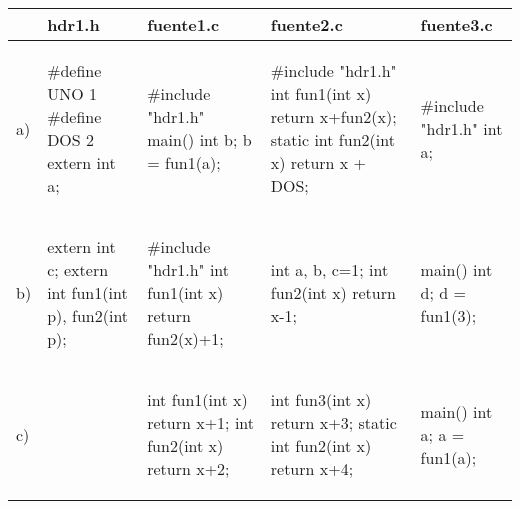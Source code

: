 \begin{table}
\centering
\begin{tabular}{p{0.2cm}|p{3cm}|p{3.5cm}|p{3.5cm}|p{3cm}}
& hdr1.h & fuente1.c & fuente2.c & fuente3.c\\
\hline


a)
&
\begin{codecell}
#define UNO 1   
#define DOS 2 
extern int a;
\end{codecell}
&
\begin{codecell}
#include "hdr1.h"
main() 
{ 
	int b;
	b = fun1(a);
}
\end{codecell}
&
\begin{codecell}
#include "hdr1.h"
int fun1(int x) 
{
	return x+fun2(x);
}
static int 
	fun2(int x) 
{
	return x + DOS;
}
\end{codecell}
&
\begin{codecell}
#include "hdr1.h"
int a;
\end{codecell}\\
\hline



b)
&
\begin{codecell}
extern int c;
extern int 
	fun1(int p), 
	fun2(int p);
\end{codecell}
&
\begin{codecell}
#include "hdr1.h"
int fun1(int x)
{
	return 
		fun2(x)+1;
}
\end{codecell}
&
\begin{codecell}
int a, b, c=1;
int fun2(int x)
{
	return x-1;
}
\end{codecell}
&
\begin{codecell}
main()
{
	int d;
	d = fun1(3);
}
\end{codecell}\\
\hline



c)
&
\begin{codecell}
 
\end{codecell}
&
\begin{codecell}
int fun1(int x)
{
	return x+1;
}
int fun2(int x)
{
	return x+2;
}
\end{codecell}
&
\begin{codecell}
int fun3(int x)
{
	return x+3;
}
static int 
	fun2(int x)
{
	return x+4;
}
\end{codecell}
&
\begin{codecell}
main()
{
	int a;
	a = fun1(a);
}
\end{codecell}\\
\hline


\end{tabular}
\end{table}
